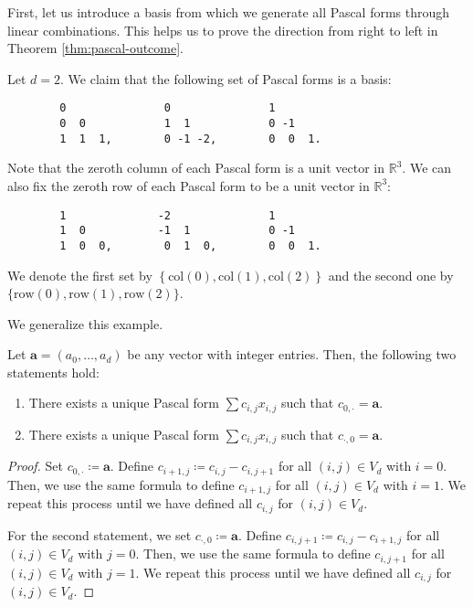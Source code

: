 First, let us introduce a basis from which we generate all Pascal forms through linear combinations. This helps us to prove the direction from right to left in Theorem \ref{thm:pascal-outcome}.

\begin{example}\label{ex:pascal-basis}
    Let \( d = 2 \). We claim that the following set of Pascal forms is a basis:
    \begin{verbatim}
        0               0               1               
        0  0            1  1            0 -1           
        1  1  1,        0 -1 -2,        0  0  1.     
    \end{verbatim}
    Note that the zeroth column of each Pascal form is a unit vector in \( \mathbb{R}^3 \). We can also fix the zeroth row of each Pascal form to be a unit vector in \( \mathbb{R}^3 \):
    \begin{verbatim}
        1              -2               1               
        1  0           -1  1            0 -1           
        1  0  0,        0  1  0,        0  0  1.
    \end{verbatim} 
    We denote the first set by \( \left\{ \mathrm{col}(0), \mathrm{col}(1), \mathrm{col}(2) \right\} \) and the second one by \( \{ \mathrm{row}(0), \mathrm{row}(1), \mathrm{row}(2) \} \).
\end{example}

We generalize this example.

\begin{proposition}\label{prop:supsup-pascal}
    Let \( \mathbf{a} = (a_0, \dots, a_d) \) be any vector with integer entries. Then, the following two statements hold:
    \begin{enumerate}
        \item There exists a unique Pascal form \( \sum c_{i,j}x_{i,j} \) such that \( c_{0,\cdot} = \mathbf a \).
        \item There exists a unique Pascal form \( \sum c_{i,j}x_{i,j} \) such that \( c_{\cdot,0} = \mathbf a \).
    \end{enumerate}
\end{proposition}

\begin{proof}
    Set \( c_{0,\cdot} \coloneqq \mathbf a \). Define \( c_{i+1,j} \coloneqq c_{i,j} - c_{i,j+1}\) for all \( (i,j) \in V_d \) with \( i=0 \). Then, we use the same formula to define \( c_{i+1,j} \) for all \( (i,j) \in V_d \) with \( i=1 \). We repeat this process until we have defined all \( c_{i,j} \) for \( (i,j) \in V_d \).

    For the second statement, we set \( c_{\cdot,0} \coloneqq \mathbf a \). Define \( c_{i,j+1} \coloneqq c_{i,j} - c_{i+1,j}\) for all \( (i,j) \in V_d \) with \( j=0 \). Then, we use the same formula to define \( c_{i,j+1} \) for all \( (i,j) \in V_d \) with \( j=1 \). We repeat this process until we have defined all \( c_{i,j} \) for \( (i,j) \in V_d \).
\end{proof}

